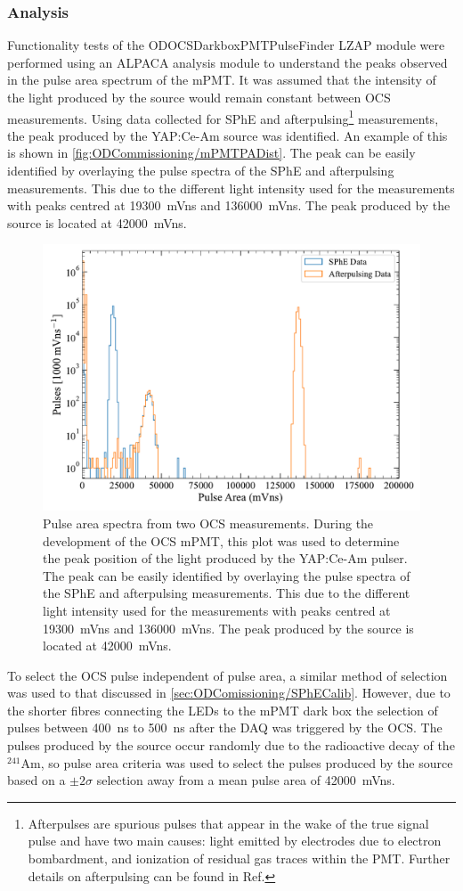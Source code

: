 \subsubsection{Analysis}\label{sec:ODCommissioning/MonitoringPMTAnalysis}
Functionality tests of the {\selectfont ODOCSDarkboxPMTPulseFinder} LZAP module were performed using an ALPACA analysis module to understand the peaks observed in the pulse area spectrum of the mPMT. It was assumed that the intensity of the light produced by the source would remain constant between OCS measurements. Using data collected for SPhE and afterpulsing\footnote{Afterpulses are spurious pulses that appear in the wake of the true signal pulse and have two main causes: light emitted by electrodes due to electron bombardment, and ionization of residual gas traces within the PMT. Further details on afterpulsing can be found in Ref.\cite{lkorley:thesis}} measurements, the peak produced by the YAP:Ce-Am source was identified. An example of this is shown in \autoref{fig:ODCommissioning/mPMTPADist}. The peak can be easily identified by overlaying the pulse spectra of the SPhE and afterpulsing measurements. This due to the different light intensity used for the measurements with peaks centred at 19300~mVns and 136000~mVns. The peak produced by the source is located at 42000~mVns.
\begin{figure}[ht!]
    \centering
    \includegraphics[width=0.7\linewidth]{figures/ODCommissioning/mPMT_PulseAreaSpectrum.pdf}
    \caption{Pulse area spectra from two OCS measurements. During the development of the OCS mPMT, this plot was used to determine the peak position of the light produced by the YAP:Ce-Am pulser. The peak can be easily identified by overlaying the pulse spectra of the SPhE and afterpulsing measurements. This due to the different light intensity used for the measurements with peaks centred at 19300~mVns and 136000~mVns. The peak produced by the source is located at 42000~mVns.}
    \label{fig:ODCommissioning/mPMTPADist}
\end{figure}
To select the OCS pulse independent of pulse area, a similar method of selection was used to that discussed in \autoref{sec:ODComissioning/SPhECalib}. However, due to the shorter fibres connecting the LEDs to the mPMT dark box the selection of pulses between 400~ns to 500~ns after the DAQ was triggered by the OCS. The pulses produced by the source occur randomly due to the radioactive decay of the $^{241}\text{Am}$, so pulse area criteria was used to select the pulses produced by the source based on a $\pm2\sigma$ selection away from a mean pulse area of 42000~mVns.

